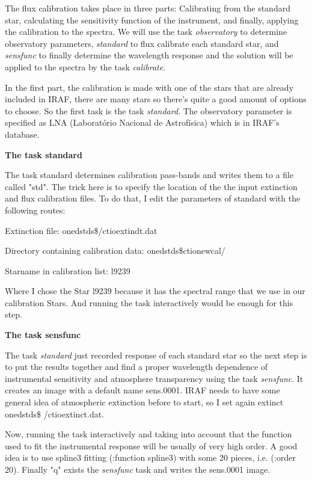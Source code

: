 The flux calibration takes place in three parts: Calibrating from the standard star, calculating the sensitivity function of the instrument, and finally, applying the calibration to the spectra. We will use the task \textit{observatory} to determine observatory parameters, \textit{standard} to flux calibrate each standard star, and \textit{sensfunc} to finally determine the wavelength response and the solution will be applied to the spectra by the task \textit{calibrate}.

In the first part, the calibration is made with one of the stars that are already included in IRAF, there are many stars so there's quite a good amount of options to choose. So the first task is the task \textit{standard}. The observatory parameter is specified as LNA (Laborat\'orio Nacional de Astrof\'isica) which is in IRAF's database. 

\textbf{The task standard}

The task standard determines calibration pass-bands and writes them to a file called "std". The trick here is to specify the location of the the input extinction and flux calibration files. To do that, I edit the parameters of standard with the following routes:

Extinction file:                              onedstds\$/ctioextindt.dat

Directory containing calibration data:   onedstds\$ctionewcal/

Starname in calibration list:                l9239

Where I chose the Star l9239 because it has the spectral range that we use in our calibration Stars. And running the task interactively would be enough for this step.

\textbf{The task sensfunc}

The task \textit{standard} just recorded response of each standard star so the next step is to put the results together and find a proper wavelength dependence of instrumental sensitivity and atmosphere transparency using the task \textit{sensfunc}. It creates an image with a default name sens.0001. IRAF needs to have some general idea of atmospheric extinction before to start, so I set again extinct onedstds\$ /ctioextinct.dat.

Now, running the task interactively and taking into account that the function used to fit the instrumental response will be usually of very high order. A good idea is to use spline3 fitting (:function spline3) with some 20 pieces, i.e. (:order 20).
Finally "q" exists the \textit{sensfunc} task and writes the sens.0001 image.

